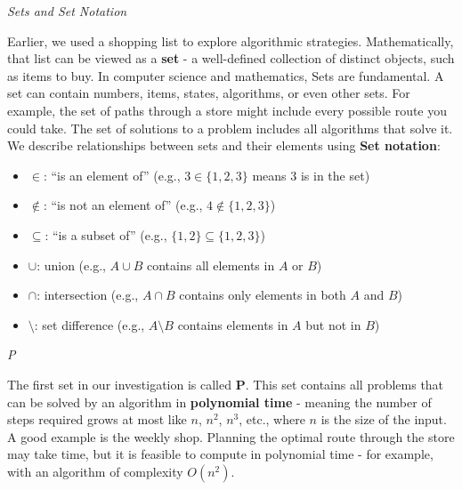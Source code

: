 \documentclass[12pt]{report}
\begin{document}
\begin{center}
    \vspace{0cm}
    {\Large\itshape Sets and Set Notation\par}
\end{center}
Earlier, we used a shopping list to explore algorithmic strategies. Mathematically, that list can be viewed as a \textbf{set} - a well-defined collection of distinct objects, such as items to buy.
In computer science and mathematics, Sets are fundamental.
A set can contain numbers, items, states, algorithms, or even other sets.
For example, the set of paths through a store might include every possible route you could take.
The set of solutions to a problem includes all algorithms that solve it.
We describe relationships between sets and their elements using \textbf{Set notation}:
\begin{itemize}
    \item $\in$: “is an element of” (e.g., $3 \in \{1, 2, 3\}$ means 3 is in the set)
    \item $\notin$: “is not an element of” (e.g., $4 \notin \{1, 2, 3\}$)
    \item $\subseteq$: “is a subset of” (e.g., $\{1,2\} \subseteq \{1,2,3\}$)
    \item $\cup$: union (e.g., $A \cup B$ contains all elements in $A$ or $B$)
    \item $\cap$: intersection (e.g., $A \cap B$ contains only elements in both $A$ and $B$)
    \item $\setminus$: set difference (e.g., $A \setminus B$ contains elements in $A$ but not in $B$)
\end{itemize}

\begin{center}
    \vspace{0cm}
    {\Large\itshape P\par}
\end{center}
The first set in our investigation is called \textbf{P}. This set contains all problems that can be solved by an algorithm in \textbf{polynomial time} - meaning the number of steps required grows at most like $n$, $n^2$, $n^3$, etc., where $n$ is the size of the input.
A good example is the weekly shop.
Planning the optimal route through the store may take time, but it is feasible to compute in polynomial time - for example, with an algorithm of complexity $O(n^2)$.
\end{document}
